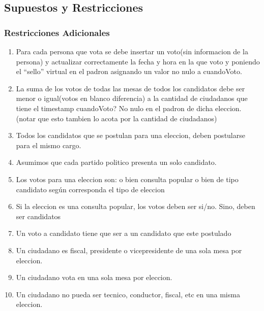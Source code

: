 \subsection{Supuestos y Restricciones}

\subsubsection{Restricciones Adicionales}

\begin{enumerate}
	\item  Para cada persona que vota se debe insertar un voto(sin informacion de la persona) y actualizar correctamente la fecha y hora en la que voto y poniendo el “sello” virtual en el padron asignando un valor no nulo a cuandoVoto.
	\item  La suma de los votos de todas las mesas de todos los candidatos debe ser menor o igual(votos en blanco diferencia) a la cantidad de ciudadanos que tiene el timestamp cuandoVoto? No nulo en el padron de dicha eleccion. (notar que esto tambien lo acota por la cantidad de ciudadanos)
	\item  Todos los candidatos que se postulan para una eleccion, deben postularse para el mismo cargo.
	\item  Asumimos que cada partido politico presenta un solo candidato.
	\item  Los votos para una eleccion son: o bien consulta popular o bien de tipo candidato según corresponda el tipo de eleccion
	\item Si la eleccion es una consulta popular, los votos deben ser si/no. Sino, deben ser candidatos
	\item Un voto a candidato tiene que ser a un candidato que este postulado
	\item Un ciudadano es fiscal, presidente o vicepresidente de una sola mesa por eleccion.
	\item Un ciudadano vota en una sola mesa por eleccion.
	\item Un ciudadano no pueda ser tecnico, conductor, fiscal, etc en una misma eleccion.
\end{enumerate}
